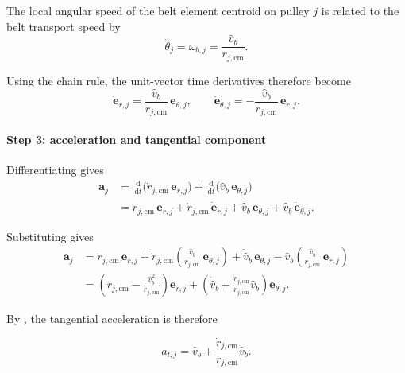 \documentclass[11pt]{article}
\numberwithin{equation}{section}
\newcommand{\dd}{\,\mathrm{d}}
\begin{document}
The local angular speed of the belt element centroid on pulley \(j\) is related
to the belt transport speed by
\begin{equation}
\dot\theta_j
=
\omega_{b,j}
=
\frac{\hat v_b}{r_{j,\mathrm{cm}}}.
\label{eq:omega_bj_repeat}
\end{equation}

Using the chain rule, the unit-vector time derivatives therefore become
\begin{equation}
\dot{\mathbf e}_{r,j}
=
\frac{\hat v_b}{r_{j,\mathrm{cm}}}\,\mathbf e_{\theta,j},
\qquad
\dot{\mathbf e}_{\theta,j}
=
-
\frac{\hat v_b}{r_{j,\mathrm{cm}}}\,\mathbf e_{r,j}.
\label{eq:unit_vectors_time_derivatives_vb}
\end{equation}

\paragraph{Step 3: acceleration and tangential component}

Differentiating  gives
\begin{align}
\mathbf a_j
&=
\frac{\dd}{\dd t}\big(\dot r_{j,\mathrm{cm}}\,\mathbf e_{r,j}\big)
+
\frac{\dd}{\dd t}\big(\hat v_b\,\mathbf e_{\theta,j}\big)
\nonumber\\[6pt]
&=
\ddot r_{j,\mathrm{cm}}\,\mathbf e_{r,j}
+
\dot r_{j,\mathrm{cm}}\,\dot{\mathbf e}_{r,j}
+
\dot{\hat v}_b\,\mathbf e_{\theta,j}
+
\hat v_b\,\dot{\mathbf e}_{\theta,j}.
\label{eq:accel_expand_vb}
\end{align}

Substituting  gives
\begin{align}
\mathbf a_j
&=
\ddot r_{j,\mathrm{cm}}\,\mathbf e_{r,j}
+
\dot r_{j,\mathrm{cm}}
\left(
\frac{\hat v_b}{r_{j,\mathrm{cm}}}\,\mathbf e_{\theta,j}
\right)
+
\dot{\hat v}_b\,\mathbf e_{\theta,j}
-
\hat v_b
\left(
\frac{\hat v_b}{r_{j,\mathrm{cm}}}\,\mathbf e_{r,j}
\right)
\nonumber\\[6pt]
&=
\left(
\ddot r_{j,\mathrm{cm}}
-
\frac{\hat v_b^2}{r_{j,\mathrm{cm}}}
\right)\mathbf e_{r,j}
+
\left(
\dot{\hat v}_b
+
\frac{\dot r_{j,\mathrm{cm}}}{r_{j,\mathrm{cm}}}\hat v_b
\right)\mathbf e_{\theta,j}.
\label{eq:accel_polar_vb}
\end{align}

By , the tangential acceleration is therefore

\begin{equation}
a_{t,j}
=
\dot{\hat v}_b
+
\frac{\dot r_{j,\mathrm{cm}}}{r_{j,\mathrm{cm}}}\hat v_b.
\label{eq:at_final}
\end{equation}
\end{document}
